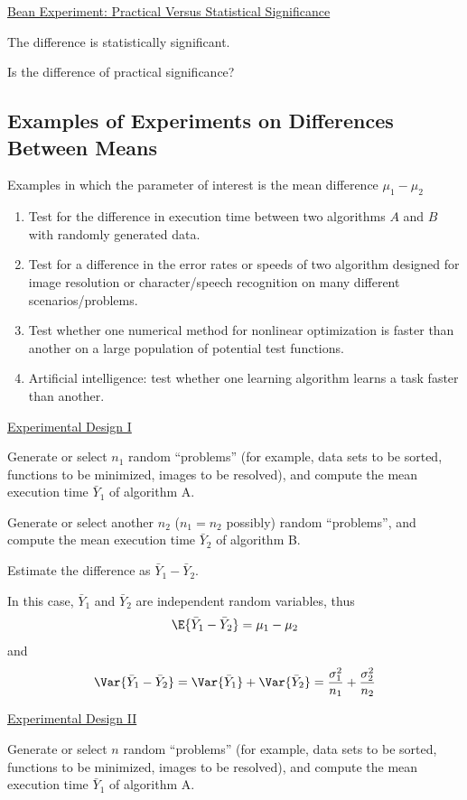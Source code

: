 \documentclass[oneside]{book}
\begin{document}
\underline{Bean Experiment: Practical Versus Statistical Significance}

The difference is statistically significant.

Is the difference of practical significance?

\subsection{Examples of Experiments on Differences Between Means}
Examples in which the parameter of interest is the mean difference $\mu_{1}-\mu_{2}$
\begin{enumerate}
    \item Test for the difference in execution time between two algorithms
          $A$ and $B$ with randomly generated data.
    \item Test for a difference in the error rates or speeds of two algorithm
          designed for image resolution or character/speech recognition on many different scenarios/problems.
    \item Test whether one numerical method for nonlinear optimization is faster
          than another on a large population of potential test functions.
    \item Artificial intelligence: test whether one learning algorithm learns a task faster than another.
\end{enumerate}

\underline{Experimental Design I}

Generate or select $n_{1}$ random ``problems'' (for example, data sets to be sorted,
functions to be minimized, images to be resolved), and compute the mean execution time $\bar{Y}_{1}$ of
algorithm A.

Generate or select another $n_{2}$ ($n_{1}=n_{2}$ possibly)
random ``problems'', and compute the mean execution time $\bar{Y}_{2}$ of algorithm B.

Estimate the difference as $\bar{Y}_{1}-\bar{Y}_{2}$.

In this case, $\bar{Y}_{1}$ and $\bar{Y}_{2}$ are independent random variables, thus
\[\E{\bar{Y}_{1}-\bar{Y}_{2}}=\mu_{1}-\mu_{2}\]
and
\[\Var{\bar{Y}_{1}-\bar{Y}_{2}}
    =\Var{\bar{Y}_{1}}+\Var{\bar{Y}_{2}}
    =\frac{\sigma_{1}^{2}}{n_{1}}+\frac{\sigma_{2}^{2}}{n_{2}}
\]

\underline{Experimental Design II}

Generate or select $n$ random ``problems''
(for example, data sets to be sorted, functions to be minimized, images to be resolved),
and compute the mean execution time $\bar{Y}_{1}$ of algorithm A.
\end{document}
